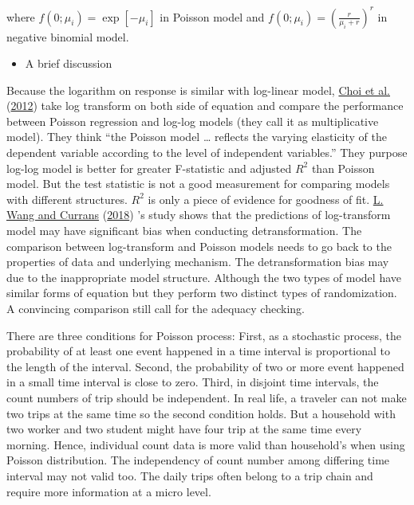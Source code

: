 \documentclass[
  11pt,
  openany]{memoir}
\providecommand{\tightlist}{%
  \setlength{\itemsep}{0pt}\setlength{\parskip}{0pt}}
\begin{document}
where \(f(0;\mu_i)= \exp[-\mu_i]\) in Poisson model and \(f(0;\mu_i)= (\frac{r}{\mu_i+r})^r\) in negative binomial model.

\begin{itemize}
\tightlist
\item
  A brief discussion
\end{itemize}

Because the logarithm on response is similar with log-linear model, \protect\hyperlink{ref-choiAnalysisMetroRidership2012}{Choi et al.} (\protect\hyperlink{ref-choiAnalysisMetroRidership2012}{2012}) take log transform on both side of equation and compare the performance between Poisson regression and log-log models (they call it as multiplicative model). They think ``the Poisson model \ldots{} reflects the varying elasticity of the dependent variable according to the level of independent variables.''
They purpose log-log model is better for greater F-statistic and adjusted \(R^2\) than Poisson model. But the test statistic is not a good measurement for comparing models with different structures. \(R^2\) is only a piece of evidence for goodness of fit.
\protect\hyperlink{ref-wangDetransformationBiasNonlinear2018}{L. Wang and Currans} (\protect\hyperlink{ref-wangDetransformationBiasNonlinear2018}{2018}) 's study shows that the predictions of log-transform model may have significant bias when conducting detransformation.
The comparison between log-transform and Poisson models needs to go back to the properties of data and underlying mechanism.
The detransformation bias may due to the inappropriate model structure.
Although the two types of model have similar forms of equation but they perform two distinct types of randomization. A convincing comparison still call for the adequacy checking.

There are three conditions for Poisson process:
First, as a stochastic process, the probability of at least one event happened in a time interval is proportional to the length of the interval.
Second, the probability of two or more event happened in a small time interval is close to zero.
Third, in disjoint time intervals, the count numbers of trip should be independent.
In real life, a traveler can not make two trips at the same time so the second condition holds.
But a household with two worker and two student might have four trip at the same time every morning. Hence, individual count data is more valid than household's when using Poisson distribution.
The independency of count number among differing time interval may not valid too. The daily trips often belong to a trip chain and require more information at a micro level.
\end{document}
